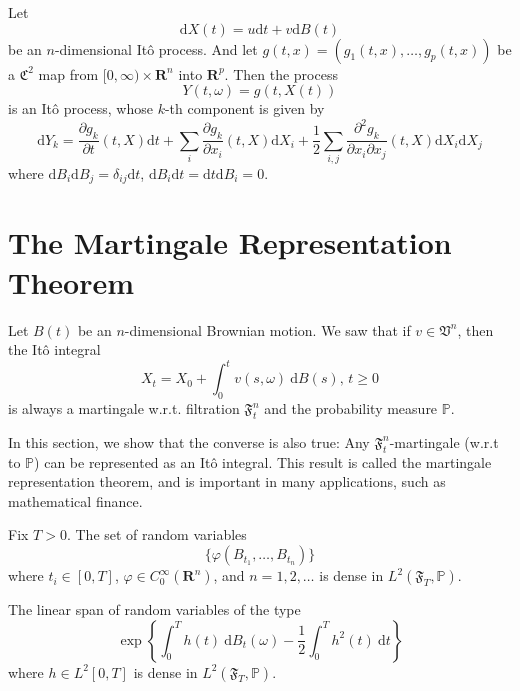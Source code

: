\begin{theorem}
    Let
    \[
        \mathrm{d}X(t) = u \mathrm{d}t + v \mathrm{d}B(t)
    \]
    be an $n$-dimensional Itô process. And let $g(t,x) = (g_1(t,x), \ldots, g_p(t,x))$ be a $\mathfrak{C}^2$ map from $[0, \infty) \times \textbf{R}^n$ into $\textbf{R}^p$. Then the process 
    \[
        Y(t, \omega) = g(t, X(t))
    \]
    is an Itô process, whose $k$-th component is given by 
    \[
        \mathrm{d}Y_k = \frac{\partial g_k}{\partial t}(t, X) \mathrm{d}t + \sum_i \frac{\partial g_k}{\partial x_i}(t, X) \mathrm{d}X_i + \frac{1}{2} \sum_{i,j} \frac{\partial^2 g_k}{\partial x_i \partial x_j} (t,X) \mathrm{d}X_i \mathrm{d}X_j
    \]
    where $\mathrm{d}B_i \mathrm{d}B_j = \delta_{ij}\mathrm{d}t$, $\mathrm{d}B_i \mathrm{d}t = \mathrm{d}t \mathrm{d}B_i = 0$.
\end{theorem}

\section{The Martingale Representation Theorem}

Let $B(t)$ be an $n$-dimensional Brownian motion. We saw that if $v \in \mathfrak{V}^n$, then the Itô integral
\begin{equation*}
    X_t = X_0 + \int_0^t v(s, \omega) ~\mathrm{d}B(s), \, t \geq 0
\end{equation*}
is always a martingale w.r.t. filtration $\mathfrak{F}_t^n$ and the probability measure $\mathbb{P}$.

In this section, we show that the converse is also true: Any $\mathfrak{F}_t^n$-martingale (w.r.t to $\mathbb{P}$) can be represented as an Itô integral. This result is called the martingale representation theorem, and is important in many applications, such as mathematical finance.

\begin{lemma}
    Fix $T > 0$. The set of random variables 
    \[
        \{ \varphi(B_{t_1}, \ldots, B_{t_n}) \}
    \]
    where $t_i \in [0, T]$, $\varphi \in C_0^\infty(\textbf{R}^n)$, and $n = 1, 2, \ldots$ is dense in $L^2(\mathfrak{F}_T, \mathbb{P})$.
\end{lemma}

\begin{lemma}
    The linear span of random variables of the type
    \begin{equation*}
        \exp \left\{ \int_0^T h(t) ~\mathrm{d}B_t(\omega) - \frac{1}{2} \int_0^T h^2(t) ~\mathrm{d}t \right\}
    \end{equation*}
    where $h \in L^2[0,T]$ is dense in $L^2(\mathfrak{F}_T, \mathbb{P})$.
\end{lemma}

